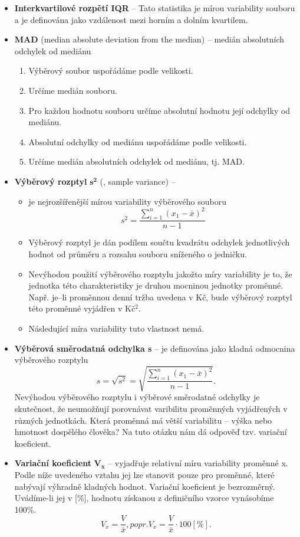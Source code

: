 \begin{itemize}
	\item \textbf{Interkvartilové rozpětí IQR} -- Tato statistika je mírou variability souboru a je definována jako vzdálenost mezi horním a dolním kvartilem.
	\item \textbf{MAD} (median absolute deviation from the median) -- medián absolutních odchylek od mediánu 
			\begin{enumerate}
				\item Výběrový soubor uspořádáme podle velikosti.
				\item Určíme medián souboru.
				\item Pro každou hodnotu souboru určíme absolutní hodnotu její odchylky od mediánu.
				\item Absolutní odchylky od mediánu uspořádáme podle velikosti.
				\item Určíme medián absolutních odchylek od mediánu, tj. MAD.
			\end{enumerate}
	\item \textbf{Výběrový rozptyl} $\mathbf{s^2}$ (, sample variance) --
		\begin{itemize}
			\item  je nejrozšířenější mírou variability výběrového souboru
			\begin{equation*}
				s^2 = \frac{\sum\limits_{i=1}^n (x_1 - \bar{x})^2} {n - 1}
			\end{equation*}
		\item Výběrový rozptyl je dán podílem součtu kvadrátu odchylek jednotlivých hodnot od průměru a rozsahu souboru sníženého o jedničku.
		\item Nevýhodou použití výběrového rozptylu jakožto míry variability je to, že jednotka této charakteristiky je druhou mocninou jednotky proměnné. Např. je--li proměnnou denní tržba uvedena v Kč, bude výběrový rozptyl této proměnné vyjádřen v Kč$^2$.
		\item Následující míra variability tuto vlastnost nemá.
	\end{itemize}
	\item \textbf{Výběrová směrodatná odchylka s} -- je definována jako kladná odmocnina výběrového rozptylu
	\begin{equation*}
				s = \sqrt{s^2} = \sqrt{\frac{\sum\limits_{i=1}^n (x_1 - \bar{x})^2} {n - 1}}.
	\end{equation*}
	Nevýhodou výběrového rozptylu i výběrové směrodatné odchylky je skutečnost, že neumožňují porovnávat varibilitu proměnných vyjádřených v různých jednotkách. Která proměnná má větší variabilitu – výška nebo hmotnost dospělého člověka? Na tuto otázku nám dá odpověď tzv. variační koeficient.
	\item \textbf{Variační koeficient} $\mathbf{V_x}$ -- vyjadřuje relativní míru variability proměnné x. Podle níže uvedeného vztahu jej lze stanovit pouze pro proměnné, které nabývají výhradně kladných hodnot. Variační koeficient je bezrozměrný. Uvádíme-li jej v [\%], hodnotu získanou z definičního vzorce vynásobíme 100\%.
	\begin{equation*}
				V_x = \frac{V}{\bar{x}}, popr. V_x = \frac{V}{\bar{x}} \cdot 100 [\%].
	\end{equation*}
\end{itemize}


